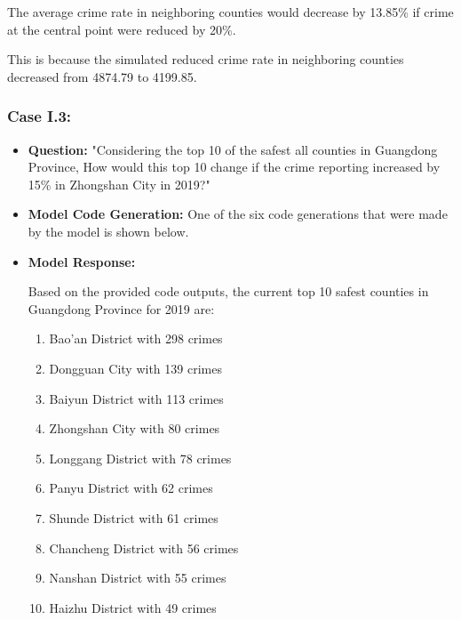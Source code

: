 \begin{itemize}
\begin{itemize}
\begin{tcolorbox}[colback=white!95!black, colframe=black, title=Q2 Response, fontupper=\scriptsize]
    The average crime rate in neighboring counties would decrease by 13.85\% if crime at the central point were reduced by 20\%. 

    This is because the simulated reduced crime rate in neighboring counties decreased from 4874.79 to 4199.85.
    
    \end{tcolorbox}

\end{itemize}
\subsubsection{Case I.3:}
\begin{itemize}
    \item \textbf{Question:} "Considering the top 10 of the safest all counties in Guangdong Province, How would this top 10 change if the crime reporting increased by 15\% in Zhongshan City in 2019?"
    \item \textbf{Model Code Generation:} One of the six code generations that were made by the model is shown below.

    
    
    
    \item \textbf{Model Response:} 
\begin{tcolorbox}[colback=white!95!black, colframe=black, title=Q3 Response, fontupper=\scriptsize]
Based on the provided code outputs, the current top 10 safest counties in Guangdong Province for 2019 are:

\begin{enumerate}
  \item Bao'an District with 298 crimes
  \item Dongguan City with 139 crimes
  \item Baiyun District with 113 crimes
  \item Zhongshan City with 80 crimes
  \item Longgang District with 78 crimes
  \item Panyu District with 62 crimes
  \item Shunde District with 61 crimes
  \item Chancheng District with 56 crimes
  \item Nanshan District with 55 crimes
  \item Haizhu District with 49 crimes
\end{enumerate}


\end{tcolorbox}
\end{itemize}
\end{itemize}
